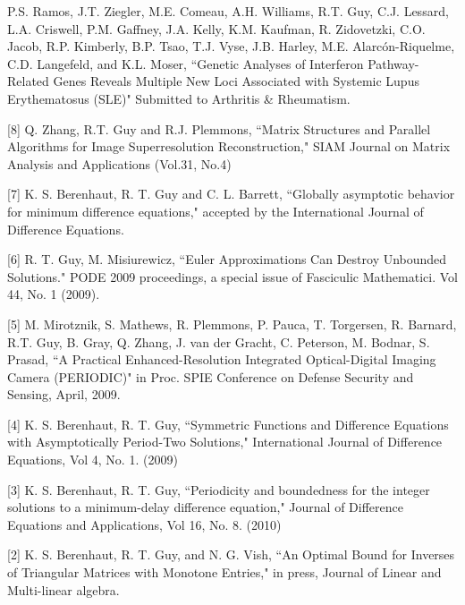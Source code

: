 \documentclass[overlapped,line,letterpaper]{res}
\begin{document}
\begin{resume}
[9] P.S. Ramos, J.T. Ziegler, M.E. Comeau, A.H. Williams, R.T. Guy, C.J. Lessard, L.A. Criswell, P.M. Gaffney, J.A. Kelly, K.M. Kaufman, R. Zidovetzki, C.O. Jacob, R.P. Kimberly, B.P. Tsao, T.J. Vyse, J.B. Harley, M.E. Alarc\'{o}n-Riquelme, C.D. Langefeld, and K.L. Moser, ``Genetic Analyses of Interferon Pathway-Related Genes Reveals Multiple New Loci Associated with Systemic Lupus Erythematosus (SLE)"  Submitted to Arthritis \& Rheumatism.



[8] Q. Zhang, R.T. Guy and R.J. Plemmons, ``Matrix Structures and Parallel Algorithms for Image Superresolution Reconstruction," SIAM Journal on Matrix Analysis and Applications (Vol.31, No.4)

[7] K. S. Berenhaut, R. T. Guy and C. L. Barrett, ``Globally asymptotic behavior for minimum difference equations," accepted by the International Journal of Difference Equations.

[6] R. T. Guy, M. Misiurewicz, ``Euler Approximations Can Destroy Unbounded Solutions." PODE 2009 proceedings, a special issue of Fasciculic Mathematici.  Vol 44, No. 1 (2009).

[5] M. Mirotznik, S. Mathews, R. Plemmons, P. Pauca, T. Torgersen, R. Barnard, R.T. Guy, B. Gray, Q. Zhang, J. van der Gracht, C. Peterson, M. Bodnar, S. Prasad, ``A Practical Enhanced-Resolution Integrated Optical-Digital Imaging Camera (PERIODIC)" in Proc. SPIE Conference on Defense Security and Sensing, April, 2009.

[4] K. S. Berenhaut, R. T. Guy, ``Symmetric Functions and Difference Equations with Asymptotically Period-Two Solutions," International Journal of Difference Equations, Vol 4, No. 1. (2009)

[3] K. S. Berenhaut, R. T. Guy, ``Periodicity and boundedness for the integer solutions to a minimum-delay
difference equation," Journal of Difference Equations and Applications, Vol 16, No. 8.  (2010)

[2] K. S. Berenhaut, R. T. Guy, and N. G. Vish, ``An Optimal Bound for Inverses of Triangular Matrices with Monotone Entries," in press, Journal of Linear and Multi-linear algebra.


\end{resume}
\end{document}

